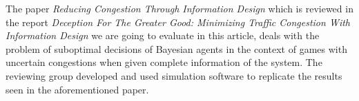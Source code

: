 The paper \textit{Reducing Congestion Through Information Design} which is reviewed in the report \textit{Deception For The Greater Good: Minimizing Traffic Congestion With
Information Design} we are going to evaluate in this article, deals with the problem of suboptimal decisions of Bayesian agents in the context of games with uncertain congestions when given complete information of the system. The reviewing group developed and used simulation software to replicate the results seen in the aforementioned paper.
